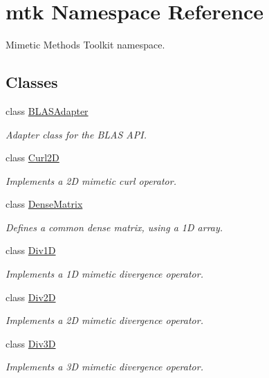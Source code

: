 \hypertarget{namespacemtk}{\section{mtk Namespace Reference}
\label{namespacemtk}
}


Mimetic Methods Toolkit namespace.  


\subsection*{Classes}
\begin{DoxyCompactItemize}
\item 
class \hyperlink{classmtk_1_1BLASAdapter}{B\+L\+A\+S\+Adapter}
\begin{DoxyCompactList}\small\item\em Adapter class for the B\+L\+A\+S A\+P\+I. \end{DoxyCompactList}\item 
class \hyperlink{classmtk_1_1Curl2D}{Curl2\+D}
\begin{DoxyCompactList}\small\item\em Implements a 2\+D mimetic curl operator. \end{DoxyCompactList}\item 
class \hyperlink{classmtk_1_1DenseMatrix}{Dense\+Matrix}
\begin{DoxyCompactList}\small\item\em Defines a common dense matrix, using a 1\+D array. \end{DoxyCompactList}\item 
class \hyperlink{classmtk_1_1Div1D}{Div1\+D}
\begin{DoxyCompactList}\small\item\em Implements a 1\+D mimetic divergence operator. \end{DoxyCompactList}\item 
class \hyperlink{classmtk_1_1Div2D}{Div2\+D}
\begin{DoxyCompactList}\small\item\em Implements a 2\+D mimetic divergence operator. \end{DoxyCompactList}\item 
class \hyperlink{classmtk_1_1Div3D}{Div3\+D}
\begin{DoxyCompactList}\small\item\em Implements a 3\+D mimetic divergence operator. \end{DoxyCompactList}\item 

\end{DoxyCompactItemize}
